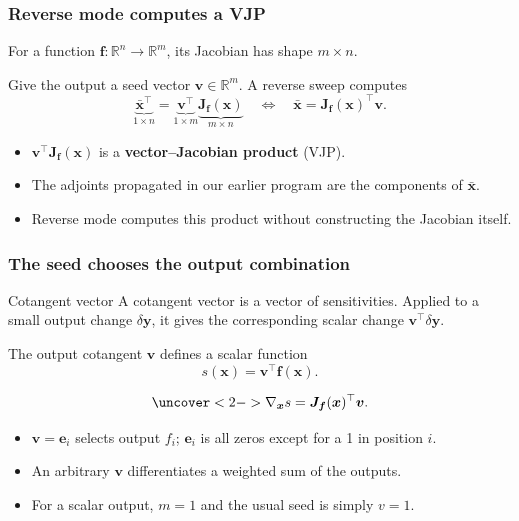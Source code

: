 \documentclass[]{article}
\begin{document}
\begin{frame}
\frametitle{Reverse mode computes a VJP}

For a function $\bm{f}:\mathbb{R}^n\rightarrow\mathbb{R}^m$, its Jacobian has shape $m\times n$.

Give the output a seed vector $\bm{v}\in\mathbb{R}^m$. A reverse sweep computes
\begin{equation*}
	\underbrace{\bar{\bm{x}}^\top}_{1\times n}
	=
	\underbrace{\bm{v}^\top}_{1\times m}
	\underbrace{\bm{J}_{\bm{f}}(\bm{x})}_{m\times n}
	\quad\Longleftrightarrow\quad
	\bar{\bm{x}}=\bm{J}_{\bm{f}}(\bm{x})^\top\bm{v}.
\end{equation*}

\begin{itemize}
	\item<2-> $\bm{v}^\top\bm{J}_{\bm{f}}(\bm{x})$ is a \textbf{vector--Jacobian product} (VJP).
	\item<3-> The adjoints propagated in our earlier program are the components of $\bar{\bm{x}}$.
	\item<4-> Reverse mode computes this product without constructing the Jacobian itself.
\end{itemize}
\end{frame}


\begin{frame}
\frametitle{The seed chooses the output combination}

\begin{block}{Cotangent vector}
	A cotangent vector is a vector of sensitivities. Applied to a small output change $\delta\bm{y}$, it gives the corresponding scalar change $\bm{v}^\top\delta\bm{y}$.
\end{block}

The output cotangent $\bm{v}$ defines a scalar function
\begin{equation*}
	s(\bm{x}) = \bm{v}^\top\bm{f}(\bm{x}).
\end{equation*}

\begin{equation*}
	\uncover<2->{\nabla_{\bm{x}}s
	=\bm{J}_{\bm{f}}(\bm{x})^\top\bm{v}.}
\end{equation*}

\begin{itemize}
	\item<3-> $\bm{v}=\bm{e}_i$ selects output $f_i$; $\bm{e}_i$ is all zeros except for a 1 in position $i$.
	\item<4-> An arbitrary $\bm{v}$ differentiates a weighted sum of the outputs.
	\item<5-> For a scalar output, $m=1$ and the usual seed is simply $v=1$.
\end{itemize}
\end{frame}
\end{document}
